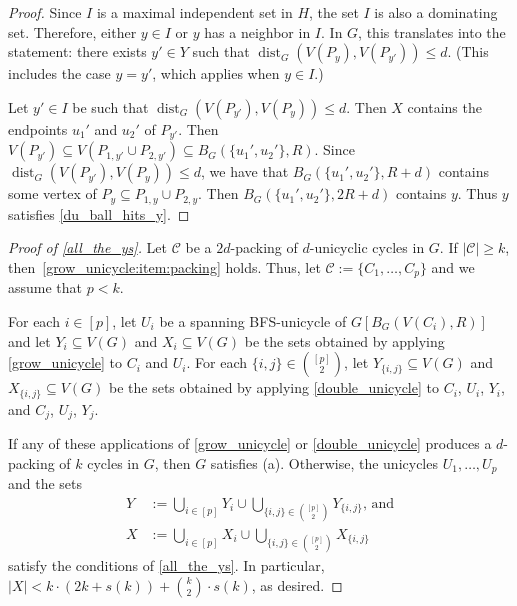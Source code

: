 \documentclass{patmorin}
\newcommand{\gwen}[1]{\textcolor{Purple}{Gwen: #1}}
\newcommand{\piotr}[1]{\textcolor{red}{Piotr: #1}}
\DeclareMathOperator{\dist}{dist}
\begin{document}
\begin{proof}
    Since $I$ is a maximal independent set in $H$, the set $I$ is also a dominating set. 
    Therefore, either $y\in I$ or $y$ has a neighbor in $I$.  In $G$, this translates into the statement: 
    there exists $y'\in Y$ such that $\dist_G(V(P_y),V(P_{y'}))\le d$.  
    (This includes the case $y=y'$, which applies when $y\in I$.)
    
    Let $y'\in I$ be such that $\dist_G(V(P_{y'}),V(P_y))\le d$.  Then $X$ contains the endpoints $u_1'$ and $u_2'$ of $P_{y'}$.  Then $V(P_{y'})\subseteq V(P_{1,y'}\cup P_{2,y'})\subseteq B_G(\{u_1',u_2'\},R)$.  Since $\dist_G(V(P_{y'}),V(P_y))\le d$, we have that  
    $B_G(\{u_1',u_2'\},R+d)$ contains some vertex of $P_y\subseteq P_{1,y}\cup P_{2,y}$. Then $B_G(\{u_1',u_2'\},2R+d)$ contains $y$.  Thus $y$ satisfies \cref{du_ball_hits_y}.
\end{proof}


\begin{proof}[Proof of \cref{all_the_ys}]
  Let $\mathcal{C}$ be a $2d$-packing of $d$-unicyclic cycles in $G$. 
  If $|\mathcal{C}|\geq k$, then~\cref{grow_unicycle:item:packing} holds.
  Thus, let $\mathcal{C}:=\{C_1,\ldots,C_p\}$ and we assume that $p<k$. 

  For each $i\in[p]$, let $U_i$ be a spanning BFS-unicycle of $G[B_G(V(C_i),R)]$ and let $Y_i\subseteq V(G)$ and $X_i\subseteq V(G)$ be the sets obtained by applying \cref{grow_unicycle} to $C_i$ and $U_i$.  For each $\{i,j\}\in \binom{[p]}{2}$, let $Y_{\{i,j\}}\subseteq V(G)$ and $X_{\{i,j\}}\subseteq V(G)$ be the sets obtained by applying \cref{double_unicycle} to $C_i$, $U_i$, $Y_i$, and $C_j$, $U_j$, $Y_j$.

  If any of these applications of \cref{grow_unicycle} or \cref{double_unicycle} produces a $d$-packing of $k$ cycles in $G$, then $G$ satisfies (a).  Otherwise, the unicycles $U_1,\ldots,U_p$ and 
  the sets 
  \begin{align*}
  Y& :=\textstyle\bigcup_{i\in[p]} Y_i\cup \bigcup_{\{i,j\}\in\binom{[p]}{2}} Y_{\{i,j\}}\text{, and} \\ X& :=\textstyle\bigcup_{i\in[p]} X_i\cup \bigcup_{\{i,j\}\in\binom{[p]}{2}} X_{\{i,j\}}
  \end{align*}
  satisfy the conditions of \cref{all_the_ys}. 
  In particular, $|X| < k\cdot(2k+s(k))+\binom{k}{2}\cdot s(k)$, as desired.
\end{proof}
\end{document}
